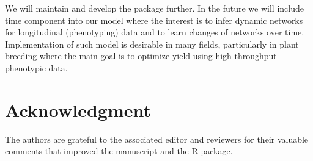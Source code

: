 We will maintain and develop the package further. In the future we will include time component into our model where the interest is to infer dynamic networks for longitudinal (phenotyping) data and to learn changes of networks over time. Implementation of such model is desirable in many fields, particularly in plant breeding where the main goal is to optimize yield using high-throughput phenotypic data. %

\section*{Acknowledgment}
The authors are grateful to the associated editor and reviewers for their valuable comments that improved the manuscript and the R package.



\address{Pariya Behrouzi\\
  Applied Mathematics and Statistics - Biometris\\
  Wageningen University and Research\\
  6708PB, Wageningen\\
  The Netherlands\\
  (https://orcid.org/0000-0001-6762-5433)\\
  }

\address{Danny Arends\\
  Albrecht Daniel Thaer-Institut für Agrar und Gartenbauwissenschaften\\
  Humboldt-Universität zu Berlin\\
  Invalidenstraße 42, 10115 Berlin\\
  Germany\\
  (https://orcid.org/0000-0001-8738-0162)\\
  }

\address{Ernst C. Wit\\
  Faculty of Science \& Informatics\\
  Universita della Svizzera Italiana (USI) \\
  Via Buffi 13\\
  6900 Lugano\\
  Switzerland\\
  (https://orcid.org/0000-0002-3671-9610)\\
  }
